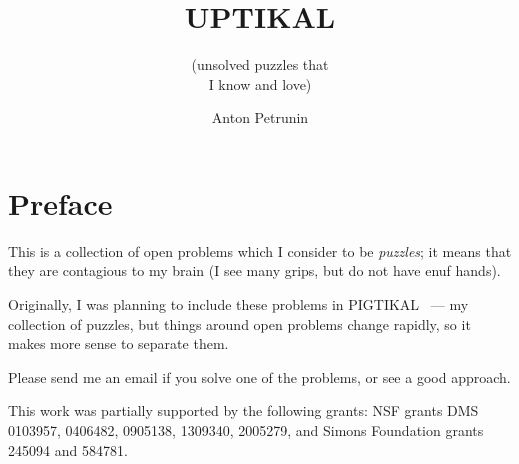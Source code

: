 \documentclass[twoside]{book}
\begin{document}

\title{UPTIKAL}
\subtitle{(unsolved puzzles that\\ I know and love)}
\author{Anton Petrunin}
\date{}
\maketitle




\newpage
\thispagestyle{empty}
\section*{Preface}

This is a collection of open problems which I consider to be \emph{puzzles};
it means that they are contagious to my brain (I see many grips, but do not have enuf hands).

Originally, I was planning to include these problems in PIGTIKAL~\cite{petrunin2021pigtikal} --- my collection of puzzles,
but things around open problems change rapidly, so it makes more sense to separate them.

Please send me an email if you solve one of the problems, or see a good approach.


This work was partially supported by the following grants:
NSF grants DMS 
0103957,
0406482,
0905138,
1309340,
2005279,
and Simons Foundation grants 
245094 and 584781.

\null\vfill{}






\backmatter
\newpage
{}
{\scriptsize

}
\sloppy
\printbibliography[heading=bibintoc]
\fussy
\end{document}

